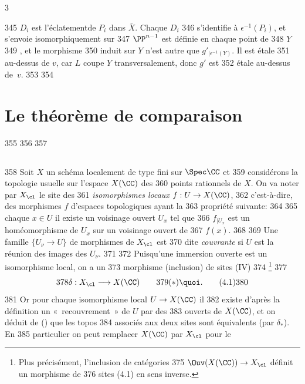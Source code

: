 3	\documentclass[10pt]{../fichiers-configuration-latex/smfart}
\begin{document}
   345	$D_i$ est l'éclatement\pageoriginale de $P_i$ dans $\bar{X}$. Chaque $D_i$
   346	s'identifie à $\epsilon^{-1}(P_i)$, et s'envoie isomorphiquement sur
   347	$\PP^{n-1}$ est définie en chaque point de
   348	$Y$%
   349	, et le morphisme
   350	induit sur $Y$ n'est autre que $g'_{\mid \epsilon^{-1}(Y)}$. Il est étale
   351	au-dessus de $v$, car $L$ coupe $Y$ transversalement, donc $g'$ est
   352	étale au-dessus de~$v$.
   353	
   354	\section{Le théorème de comparaison}
   355	
   356	\setcounter{subsection}{-1}
   357	\subsection{}
   358	Soit $X$ un schéma localement de type fini sur $\Spec \CC$ et
   359	considérons la topologie usuelle sur l'espace $X(\CC)$ des
   360	points rationnels de $X$. On va noter par $X_{\cl}$ le site des
   361	\emph{isomorphismes locaux} $f:U\rightarrow X(\CC)$,
   362	c'est-à-dire, des morphismes $f$ d'espaces topologiques ayant la
   363	propriété suivante:
   364	
   365	 chaque $x\in U$ il existe un voisinage ouvert $U_x$ tel que
   366	$f_{\mid U_x}$ est un homéomorphisme de $U_x$ sur un voisinage ouvert de
   367	$f(x)$. 
   368	
   369	Une famille $\{U_{\nu}\rightarrow U\}$ de morphismes de $X_{\cl}$ est
   370	dite \emph{couvrante} si $U$ est la réunion des images des $U_{\nu}$.
   371	
   372	Puisqu'une immersion ouverte est un isomorphisme local, on a un
   373	morphisme (inclusion) de sites (IV\quad ) %
   374	\footnote{Plus précisément, l'inclusion de catégories
   375	  $\Ouv(X(\CC))\rightarrow X_{\cl}$ définit un morphisme de
   376	  sites (4.1) en sens inverse.}
   377	\begin{equation*}
   378	\delta:X_{\cl}\longrightarrow X(\CC)\qquad
   379	(\ast){\quoi}.\tag{4.1}
   380	\end{equation*}
   381	Or pour chaque isomorphisme local $U\rightarrow X(\CC)$ il
   382	existe d'après la définition un « recouvrement » de $U$ par des
   383	ouverts de $X(\CC)$, et on déduit de (\quad) que les topos %
   384	associés aux deux sites sont équivalents (par $\delta_{\ast}$). En
   385	particulier on peut remplacer $X(\CC)$ par $X_{\cl}$ pour le
\end{document}
